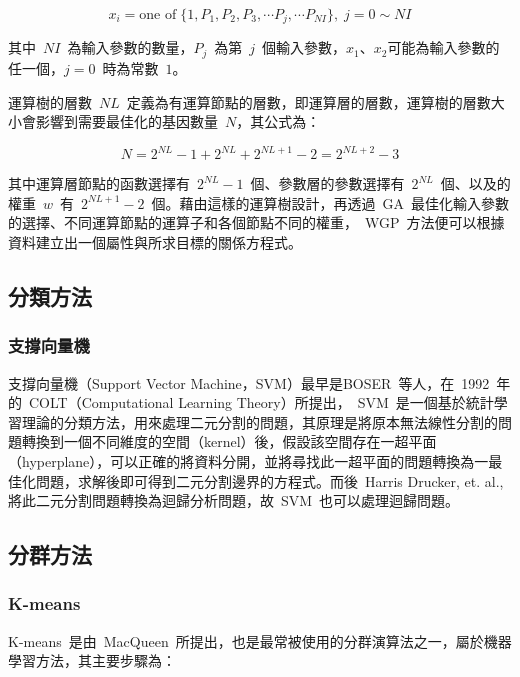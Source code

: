 \begin{equation} x_i = \text{one of}\; \{1, P_1, P_2, P_3, \cdots P_j, \cdots P_{NI}\},\; j = 0 \sim NI \label{eq:WGP-xi}\end{equation}

其中~$NI$~為輸入參數的數量，$P_j$~為第~$j$~個輸入參數，$x_1$、$x_2$可能為輸入參數的任一個，$j = 0$~時為常數~$1$。

運算樹的層數~$NL$~定義為有運算節點的層數，即運算層的層數，運算樹的層數大小會影響到需要最佳化的基因數量~$N$，其公式為：

\begin{equation} N = 2^{NL} - 1 + 2^{NL} + 2^{NL + 1} - 2 = 2^{NL + 2} - 3  \label{eq:WGP-N}\end{equation}


其中運算層節點的函數選擇有~$2^{NL} - 1$~個、參數層的參數選擇有~$2^{NL}$~個、以及的權重~$w$~有~$2^{NL + 1} - 2$~個。藉由這樣的運算樹設計，再透過~GA~最佳化輸入參數的選擇、不同運算節點的運算子和各個節點不同的權重，~WGP~方法便可以根據資料建立出一個屬性與所求目標的關係方程式。

\subsection{分類方法}

\subsubsection{支撐向量機}

支撐向量機（Support Vector Machine，SVM）最早是BOSER~\cite{boser1992}等人，在~1992~年的~COLT（Computational Learning Theory）所提出，~SVM~是一個基於統計學習理論的分類方法，用來處理二元分割的問題，其原理是將原本無法線性分割的問題轉換到一個不同維度的空間（kernel）後，假設該空間存在一超平面（hyperplane），可以正確的將資料分開，並將尋找此一超平面的問題轉換為一最佳化問題，求解後即可得到二元分割邊界的方程式。而後~Harris Drucker, et. al.,\cite{drucker1997support} 將此二元分割問題轉換為迴歸分析問題，故~SVM~也可以處理迴歸問題。

\subsection{分群方法}

\subsubsection{K-means}

K-means~是由~MacQueen\cite{macqueen67}~所提出，也是最常被使用的分群演算法之一，屬於機器學習方法，其主要步驟為：

